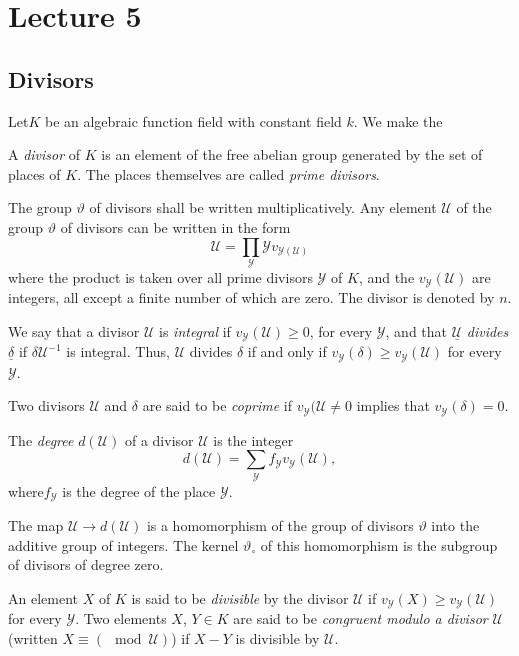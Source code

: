 \chapter{Lecture 5}\label{chap5}

\setcounter{section}{8}
\section{Divisors}\label{chap5:sec9}%

Let\pageoriginale $K$ be an algebraic function field with constant field $k$. We make the
\begin{defi*}
  A {\em divisor} of $K$ is an element of the free abelian group
  generated by the set of places of $K$. The places themselves are
  called {\em prime divisors}. 
\end{defi*}

The group $\vartheta$ of divisors shall be written
multiplicatively. Any element $\mathscr{U}$ of the group $\vartheta$
of divisors can be written in the form 
$$
\mathscr{U} = \prod_{\mathscr{Y}} \mathscr{Y} v_{\mathscr{Y}(\mathscr{U})}
$$ 
where the product is taken over all prime divisors $\mathscr{Y}$ of
$K$, and the $v_\mathscr{Y}(\mathscr{U})$ are integers, all except a
finite number of which are zero. The divisor is denoted by $n$. 

We say that a divisor $\mathscr{U}$ is \textit{integral} if
$v_\mathscr{Y}(\mathscr{U}) \geq 0$, for every $\mathscr{Y}$, and that
$\underline{\mathscr{U}}$ \textit{divides} $\underline{\delta}$ if
$\delta \mathscr{U}^{-1}$ is integral. Thus, $\mathscr{U}$ divides
$\delta$ if and only if $v_\mathscr{Y} (\delta) \geq v_{\mathscr{Y}} (\mathscr{U})$
for every $\mathscr{Y}$. 

Two divisors $\mathscr{U}$ and $\delta$ are said to be
\textit{coprime} if $v_\mathscr{Y}(\mathscr{U} \neq 0$ implies that
$v_\mathscr{Y} (\delta ) = 0$. 

The \textit{degree} $d(\mathscr{U})$ of a divisor $\mathscr{U}$ is the
integer 
$$
d(\mathscr{U}) = \sum_\mathscr{Y} f_\mathscr{Y} v_\mathscr{Y}(\mathscr{U}),
$$
where\pageoriginale $f_\mathscr{Y}$ is the degree of the place $\mathscr{Y}$.

The map $\mathscr{U} \to d(\mathscr{U})$ is a homomorphism of the
group of divisors $\vartheta$ into the additive group of integers. The
kernel $\vartheta_\circ$ of this homomorphism is the subgroup of
divisors of degree zero. 

An element $X$ of $K$ is said to be \textit{divisible} by the divisor
$\mathscr{U}$ if $v_\mathscr{Y}(X) \geq v_\mathscr{Y}(\mathscr{U})$
for every $\mathscr{Y}$. Two elements $X$, $Y \in K$ are said to be
\textit{congruent modulo a divisor} $\mathscr{U}$ (written $X \equiv
(\mod \mathscr{U})$) if $X-Y$ is divisible by $\mathscr{U}$. 

